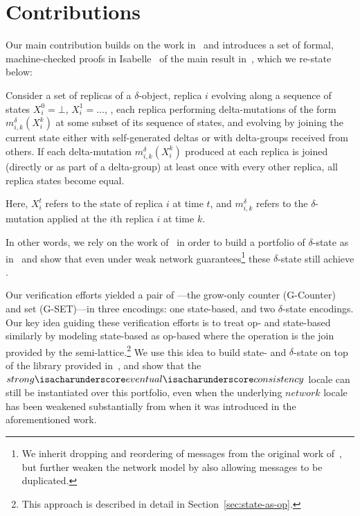 \section{Contributions}

Our main contribution builds on the work in~\citet{gomes17} and introduces a set
of formal, machine-checked proofs in Isabelle~\citep{wenzel02} of the main
result in~\citet{almedia18}, which we re-state below:

\begin{theorem}
  Consider a set of replicas of a $\delta$-\CRDT object, replica $i$ evolving
  along a sequence of states $X_i^0 = \bot$, $X_i^1=\ldots$, , each replica
  performing delta-mutations of the form $m^\delta_{i,k}(X^k_i)$ at some subset
  of its sequence of states, and evolving by joining the current state either
  with self-generated deltas or with delta-groups received from others. If each
  delta-mutation $m^\delta _{i,k}(X^k_i)$ produced at each replica is joined
  (directly or as part of a delta-group) at least once with every other replica,
  all replica states become equal.
\end{theorem}

Here, $X_i^t$ refers to the state of replica $i$ at time $t$, and
$m^\delta_{i,k}$ refers to the $\delta$-mutation applied at the $i$th replica
$i$ at time $k$.

In other words, we rely on the work of~\citet{gomes17} in order to build a
portfolio of $\delta$-state \CRDTs as in~\citet{almedia18} and show that even
under weak network guarantees\footnote{We inherit dropping and reordering of
messages from the original work of~\citet{gomes17}, but further weaken the
network model by also allowing messages to be duplicated.} these $\delta$-state
\CRDTs still achieve \SEC.

Our verification efforts yielded a pair of \CRDTs---the grow-only counter
(G-Counter) and set (G-SET)---in three encodings: one state-based, and two
$\delta$-state encodings. Our key idea guiding these verification efforts is to
treat op- and state-based \CRDTs similarly by modeling state-based \CRDTs as
op-based where the operation is the join provided by the
semi-lattice.\footnote{This approach is described in detail in
Section~\ref{sec:state-as-op}.} We use this idea to build state- and
$\delta$-state \CRDTs on top of the library provided in~\citet{gomes17}, and
show that the
$strong{\isacharunderscore}eventual{\isacharunderscore}consistency$ locale can
still be instantiated over this portfolio, even when the underlying $network$
locale has been weakened substantially from when it was introduced in the
aforementioned work.


